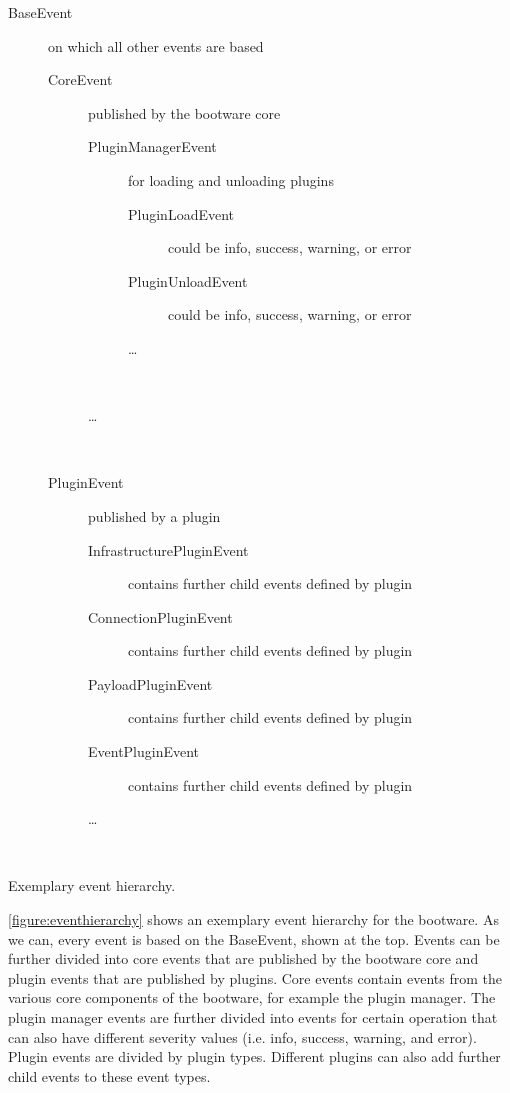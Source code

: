 \vspace*{\baselineskip}
\begingroup
	\centering
	\captionsetup{type=figure}
	\begin{description}
		\item[BaseEvent] on which all other events are based
		\begin{description}
			\item[CoreEvent] published by the bootware core
			\begin{description}
				\item[PluginManagerEvent] for loading and unloading plugins
				\begin{description}
					\item[PluginLoadEvent] could be info, success, warning, or error
					\item[PluginUnloadEvent] could be info, success, warning, or error
					\item[\ldots] ~
				\end{description}
				\item[\ldots] ~
			\end{description}
		\end{description}
		\begin{description}
			\item[PluginEvent] published by a plugin
			\begin{description}
				\item[InfrastructurePluginEvent] contains further child events defined by plugin
				\item[ConnectionPluginEvent] contains further child events defined by plugin
				\item[PayloadPluginEvent] contains further child events defined by plugin
				\item[EventPluginEvent] contains further child events defined by plugin
				\item[\ldots] ~
			\end{description}
		\end{description}
	\end{description}
	\caption{Exemplary event hierarchy.}
	\label{figure:eventhierarchy}
\endgroup

\autoref{figure:eventhierarchy} shows an exemplary event hierarchy for the bootware.
As we can, every event is based on the BaseEvent, shown at the top.
Events can be further divided into core events that are published by the bootware core and plugin events that are published by plugins.
Core events contain events from the various core components of the bootware, for example the plugin manager.
The plugin manager events are further divided into events for certain operation that can also have different severity values (i.e. info, success, warning, and error).
Plugin events are divided by plugin types.
Different plugins can also add further child events to these event types.
